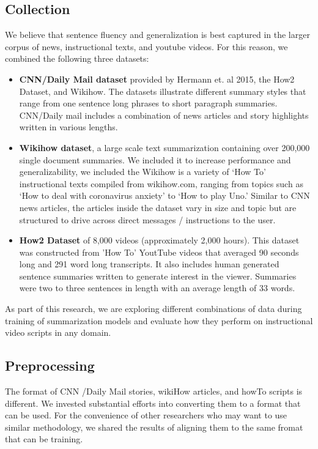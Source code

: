 \documentclass{article}
\begin{document}
\subsection{Collection}
We believe that sentence fluency and generalization is best captured in the larger corpus of news, instructional texts, and youtube videos. For this reason, we combined the following three datasets: 
\begin{itemize}

\item \textbf{CNN/Daily Mail dataset} provided by Hermann et. al 2015, the How2 Dataset, and Wikihow. The datasets illustrate different summary styles that range from one sentence long phrases to short paragraph summaries. CNN/Daily mail includes a combination of news articles and story highlights written in various lengths. 
\item \textbf{Wikihow dataset}, a large scale text summarization containing over 200,000 single document summaries. We included it to increase performance and generalizability, we included the  Wikihow is a variety of ‘How To’ instructional texts compiled from wikihow.com, ranging from topics such as ‘How to deal with coronavirus anxiety’ to ‘How to play Uno.’ Similar to CNN news articles, the articles inside the dataset vary in size and topic but are structured to drive across direct messages / instructions to the user. 
\item \textbf{How2 Dataset} of 8,000 videos (approximately 2,000 hours). This dataset was constructed from 'How To' YoutTube videos that averaged 90 seconds long and 291 word long transcripts. It also includes human generated sentence summaries written to generate interest in the viewer. Summaries were two to three sentences in length with an average length of 33 words. 
\end{itemize}

As part of this research, we are exploring different combinations of data during training of summarization models and evaluate how they perform on  instructional video scripts in any domain.  


\subsection{Preprocessing}
\label{Preprocessing}

The format of CNN /Daily Mail stories, wikiHow articles, and howTo scripts is different. We invested substantial efforts into converting them to a format that can be used. For the convenience of other researchers who may want to use similar methodology, we shared the results of aligning them to the same fromat that can be training. 
\end{document}
